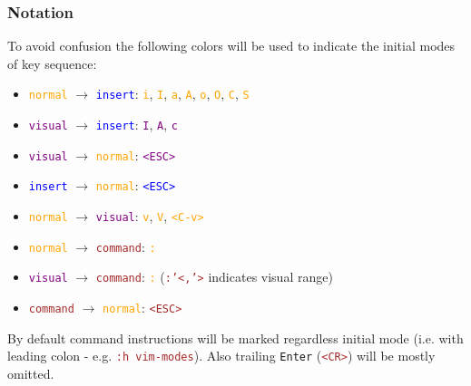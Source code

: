 \documentclass{beamer}
\newcommand{\vimmode}[1]{\texttt{#1}}
\newcommand{\viminsert}[1]{\texttt{\textcolor{blue}{#1}}}
\newcommand{\vimnormal}[1]{\texttt{\textcolor{orange}{#1}}}
\newcommand{\vimcommand}[1]{\texttt{\textcolor{brown}{#1}}}
\newcommand{\vimvisual}[1]{\texttt{\textcolor{purple}{#1}}}
\newcommand{\vimkey}[1]{\textless{}#1\textgreater{}}
\begin{document}
\begin{frame}[fragile]
    \frametitle{Notation}
    To avoid confusion the following colors will be used to indicate the initial modes of key sequence:
    \begin{itemize}
        \item \vimnormal{\vimmode{normal}} $\rightarrow$ \viminsert{\vimmode{insert}}: \vimnormal{i}, \vimnormal{I}, \vimnormal{a}, \vimnormal{A}, \vimnormal{o}, \vimnormal{O}, \vimnormal{C}, \vimnormal{S}
        \item \vimvisual{\vimmode{visual}} $\rightarrow$ \viminsert{\vimmode{insert}}: \vimvisual{I}, \vimvisual{A}, \vimvisual{c}
        \item \vimvisual{\vimmode{visual}} $\rightarrow$ \vimnormal{\vimmode{normal}}: \vimvisual{\vimkey{ESC}}
        \item \viminsert{\vimmode{insert}} $\rightarrow$ \vimnormal{\vimmode{normal}}: \viminsert{\vimkey{ESC}}
        \item \vimnormal{\vimmode{normal}} $\rightarrow$ \vimvisual{\vimmode{visual}}: \vimnormal{v}, \vimnormal{V}, \vimnormal{\vimkey{C-v}}
        \item \vimnormal{\vimmode{normal}} $\rightarrow$ \vimcommand{command}: \vimnormal{:}
        \item \vimvisual{\vimmode{visual}} $\rightarrow$ \vimcommand{command}: \vimnormal{:} (\vimcommand{:'\textless{},'\textgreater{}} indicates visual range) 
        \item \vimcommand{command} $\rightarrow$ \vimnormal{\vimmode{normal}}: \vimcommand{\vimkey{ESC}}
    \end{itemize}
    By default command instructions will be marked regardless initial mode (i.e. with leading colon - e.g. \vimcommand{:h vim-modes}). Also trailing \texttt{Enter} (\vimcommand{\vimkey{CR}}) will be mostly omitted.
\end{frame}
\end{document}
